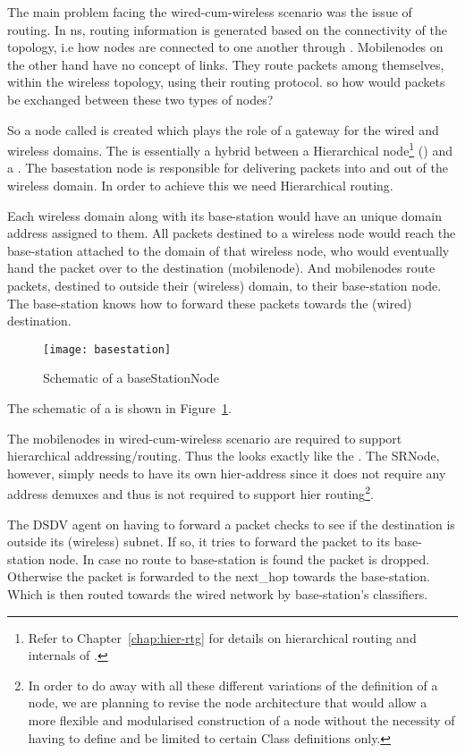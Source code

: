 The main problem facing the wired-cum-wireless scenario was the issue
of routing. In ns, routing information is generated based on the
connectivity of the topology, i.e how nodes are connected to one
another through . Mobilenodes on the other hand have no
concept of links. They route packets among themselves, within the
wireless topology, using their routing protocol. so how would packets
be exchanged between these two types of nodes? 

So a node called  is created which plays the
role of a gateway for the wired and wireless domains. The
 is essentially a hybrid between a Hierarchical
node\footnote{Refer to Chapter~\ref{chap:hier-rtg} for details on
  hierarchical routing and internals of .}
() and a . The basestation node is
responsible for delivering packets into and out of the wireless
domain. In order to achieve this we need Hierarchical routing. 

Each wireless domain along with its base-station would have an unique
domain address assigned to them. All packets destined to a wireless
node would reach the base-station attached to the domain of that
wireless node, who would eventually hand the packet
over to the destination (mobilenode). And mobilenodes route packets,
destined to outside their (wireless) domain, to their base-station
node. The base-station knows how to forward these packets towards the
(wired) destination.
\begin{figure}
    \centerline{\texttt{[image: basestation]}}
    \caption{Schematic of a baseStationNode}
    \label{fig:mobilenode-basestation}
\end{figure}
The schematic of a  is shown in
Figure~\ref{fig:mobilenode-basestation}.

The mobilenodes in wired-cum-wireless scenario are required to support
hierarchical addressing/routing. Thus the  looks
exactly like the . The SRNode, however, simply
needs to have its own hier-address since it does not require any
address demuxes and thus is not required to support hier
routing\footnote{In order to do away with all these different
  variations of the definition of a node, we are planning to revise
  the node architecture that would allow a more flexible
  and modularised construction of a node without the necessity of having
  to define and be limited to certain Class definitions only.}.

The DSDV agent on having to forward a packet checks to see if the
destination is outside its (wireless) subnet. If so, it tries to
forward the packet to its base-station node. In case no route to
base-station is found the packet is dropped. Otherwise the
packet is forwarded to the next\_hop towards the base-station. Which
is then routed towards the wired network by base-station's
classifiers.

